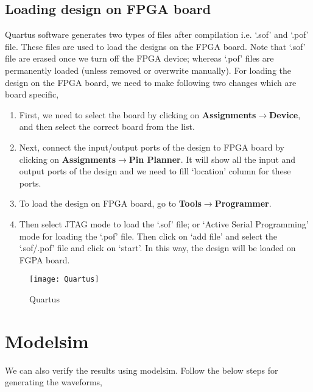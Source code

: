 \subsection{Loading design on FPGA board}
Quartus software generates two types of files after compilation i.e. `.sof' and `.pof' file. These files are used to load the designs on the FPGA board. Note that `.sof' file are erased once we turn off the FPGA device; whereas `.pof' files are permanently loaded (unless removed or overwrite manually). For loading the design on the FPGA board, we need to make following two changes which are board specific, 
\begin{enumerate}
	\item First, we need to select the board by clicking on \textbf{Assignments$\rightarrow$Device}, and then select the correct board from the list. 
	\item Next, connect the input/output ports of the design to FPGA board by clicking on \textbf{Assignments$\rightarrow$Pin Planner}. It will show all the input and output ports of the design and we need to fill `location' column for these ports. 
	
	\item To load the design on FPGA board, go to \textbf{Tools$\rightarrow$Programmer}. 
	\item Then select JTAG mode to load the `.sof' file; or `Active Serial Programming' mode for loading the `.pof' file. Then click on `add file' and  select the `.sof/.pof' file and click on `start'. In this way, the design will be loaded on FGPA board. 
\end{enumerate}


\begin{figure}[!h]
	\centering
	\texttt{[image: Quartus]}
	\caption{Quartus}
	\label{fig:Quartus}
\end{figure}


\section{Modelsim}
We can also verify the results using modelsim. Follow the below steps for generating the waveforms, 

